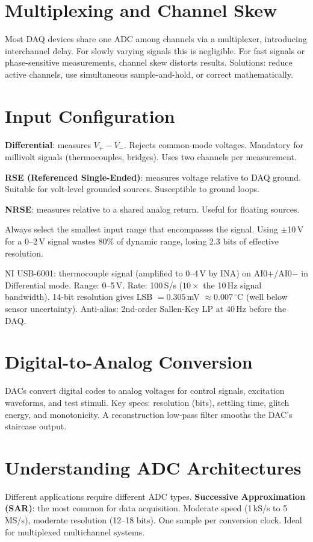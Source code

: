 \documentclass[11pt,letterpaper,twoside,openany]{book}
\newcommand{\degC}{\ensuremath{{}^{\circ}\text{C}}}
\begin{document}
\section{Multiplexing and Channel Skew}
Most DAQ devices share one ADC among channels via a multiplexer, introducing interchannel delay. For slowly varying signals this is negligible. For fast signals or phase-sensitive measurements, channel skew distorts results. Solutions: reduce active channels, use simultaneous sample-and-hold, or correct mathematically.

\section{Input Configuration}
\textbf{Differential}: measures $V_+ - V_-$. Rejects common-mode voltages. Mandatory for millivolt signals (thermocouples, bridges). Uses two channels per measurement.

\textbf{RSE (Referenced Single-Ended)}: measures voltage relative to DAQ ground. Suitable for volt-level grounded sources. Susceptible to ground loops.

\textbf{NRSE}: measures relative to a shared analog return. Useful for floating sources.

Always select the smallest input range that encompasses the signal. Using $\pm$10\,V for a 0--2\,V signal wastes 80\% of dynamic range, losing 2.3 bits of effective resolution.

\begin{examplebox}
NI USB-6001: thermocouple signal (amplified to 0--4\,V by INA) on AI0+/AI0$-$ in Differential mode. Range: 0--5\,V. Rate: 100\,S/s ($10\times$ the 10\,Hz signal bandwidth). 14-bit resolution gives LSB $= 0.305$\,mV $\approx 0.007$\,\degC{} (well below sensor uncertainty). Anti-alias: 2nd-order Sallen-Key LP at 40\,Hz before the DAQ.
\end{examplebox}

\section{Digital-to-Analog Conversion}
DACs convert digital codes to analog voltages for control signals, excitation waveforms, and test stimuli. Key specs: resolution (bits), settling time, glitch energy, and monotonicity. A reconstruction low-pass filter smooths the DAC's staircase output.


\section{Understanding ADC Architectures}
Different applications require different ADC types. \textbf{Successive Approximation (SAR)}: the most common for data acquisition. Moderate speed (1\,kS/s to 5\,MS/s), moderate resolution (12--18 bits). One sample per conversion clock. Ideal for multiplexed multichannel systems.
\end{document}
